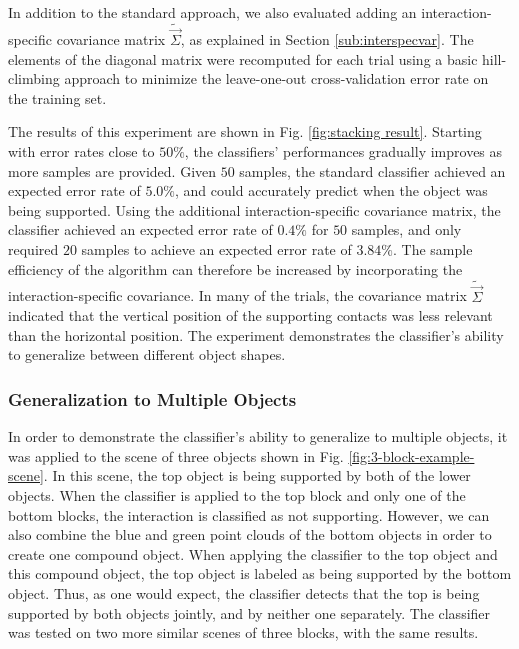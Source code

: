 In addition to the standard approach, we also evaluated adding an
interaction-specific covariance matrix $\tilde{\vec{\Sigma}}$, as
explained in Section \ref{sub:interspecvar}. The elements of the diagonal matrix were
recomputed for each trial using a basic hill-climbing approach to minimize
the leave-one-out cross-validation error rate on the training set.

The results of this experiment are shown in Fig. \ref{fig:stacking result}.
Starting with error rates close to $50\%$, the classifiers' performances
gradually improves as more samples are provided. Given $50$ samples,
the standard classifier achieved an expected error rate of $5.0\%$,
and could accurately predict when the object was being supported. Using
the additional interaction-specific covariance matrix, the classifier
achieved an expected error rate of $0.4\%$ for $50$ samples, and
only required $20$ samples to achieve an expected error rate of $3.84\%$.
The sample efficiency of the algorithm can therefore be increased
by incorporating the interaction-specific covariance.
In many of the trials, the covariance matrix $\tilde{\vec{\Sigma}}$ indicated that
the vertical position of the supporting contacts was less relevant
than the horizontal position. The experiment
demonstrates the classifier's ability to generalize between different
object shapes. 



\subsubsection*{Generalization to Multiple Objects}

In order to demonstrate the classifier's ability to generalize to
multiple objects, it was applied to the scene of three objects shown
in Fig. \ref{fig:3-block-example-scene}. In this scene, the top object
is being supported by both of the lower objects. When the classifier
is applied to the top block and only one of the bottom blocks, the
interaction is classified as not supporting. However, we can also
combine the blue and green point clouds of the bottom objects in order
to create one compound object. When applying the classifier to the
top object and this compound object, the top object is labeled as
being supported by the bottom object. Thus, as one would expect, the
classifier detects that the top is being supported by both objects
jointly, and by neither one separately. The classifier was tested
on two more similar scenes of three blocks, with the same results.



